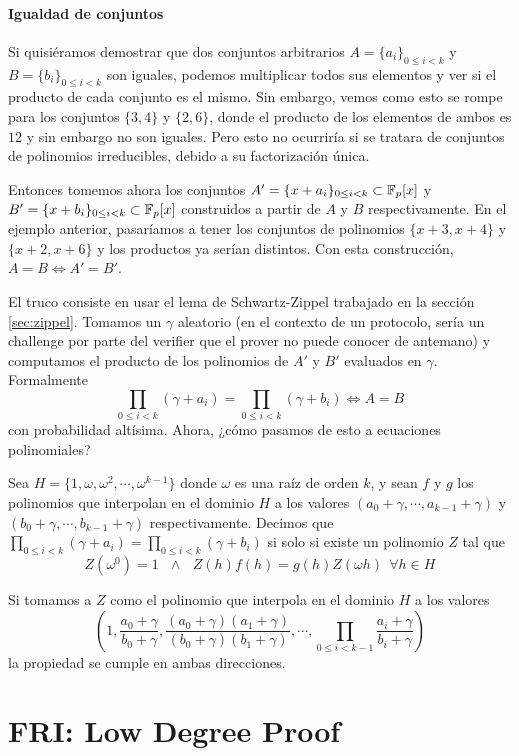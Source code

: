 \documentclass[11pt,a4paper]{tesis}
\begin{document}
\subsubsection{\textbf{Igualdad de conjuntos}}
Si quisiéramos demostrar que dos conjuntos arbitrarios $A = \{a_i\}_{0\leq i<k}$ y $B = \{b_i\}_{0\leq i<k}$ son iguales, podemos multiplicar todos sus elementos y ver si el producto de cada conjunto es el mismo. Sin embargo, vemos como esto se rompe para los conjuntos $\{3,4\}$ y $\{2,6\}$, donde el producto de los elementos de ambos es $12$ y sin embargo no son iguales. Pero esto no ocurriría si se tratara de conjuntos de polinomios irreducibles, debido a su factorización única.

Entonces tomemos ahora los conjuntos $A' = \{x+a_i\}_{0\leq i<k} \subset \mathbb{F}_p[x]$ y $B' = \{x+b_i\}_{0\leq i<k} \subset \mathbb{F}_p[x]$ construidos a partir de $A$ y $B$ respectivamente. En el ejemplo anterior, pasaríamos a tener los conjuntos de polinomios $\{x+3,x+4\}$ y $\{x+2,x+6\}$ y los productos ya serían distintos. Con esta construcción, $A=B \Leftrightarrow A'= B'$.

El truco consiste en usar el lema de Schwartz-Zippel trabajado en la sección \ref{sec:zippel}. Tomamos un $\gamma$ aleatorio (en el contexto de un protocolo, sería un challenge por parte del verifier que el prover no puede conocer de antemano) y computamos el producto de los polinomios de $A'$ y $B'$ evaluados en $\gamma$. Formalmente
$$\prod_{0 \leq i < k}(\gamma + a_i) = \prod_{0 \leq i < k}(\gamma + b_i) \Leftrightarrow A = B$$
con probabilidad altísima. Ahora, ¿cómo pasamos de esto a ecuaciones polinomiales? 

Sea $H = \{1, \omega, \omega^2, \cdots, \omega^{k-1}\}$ donde $\omega$ es una raíz de orden $k$, y sean $f$ y $g$ los polinomios que interpolan en el dominio $H$ a los valores $(a_0+\gamma, \cdots, a_{k-1} + \gamma)$ y $(b_0+\gamma, \cdots, b_{k-1} + \gamma)$ respectivamente. Decimos que $\prod_{0 \leq i < k}(\gamma + a_i) = \prod_{0 \leq i < k}(\gamma + b_i)$ si solo si existe un polinomio $Z$ tal que 
$$Z(\omega^0) = 1 ~~~ \land ~~~ Z(h)f(h) = g(h)Z(\omega h) ~~ \forall h \in H$$

Si tomamos a $Z$ como el polinomio que interpola en el dominio $H$ a los valores
$$(1, \frac{a_0 + \gamma}{b_0 + \gamma}, \frac{(a_0 + \gamma)(a_1 + \gamma)}{(b_0 + \gamma)(b_1 + \gamma)}, \cdots, \prod_{0\leq i < k-1}\frac{a_i+\gamma}{b_i+\gamma})$$
la propiedad se cumple en ambas direcciones.  

\chapter{FRI: Low Degree Proof}\label{sec:fri_ldp}
\end{document}
